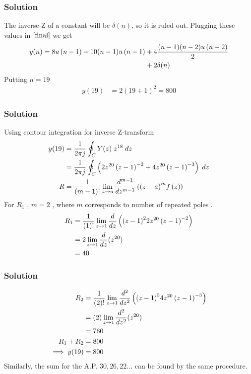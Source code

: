 \documentclass{beamer}
\begin{document}
\begin{frame}
\frametitle{Solution}
The inverse-Z of a constant will be $\delta(n)$, so it is ruled out.
Plugging these values in $\eqref{final}$ we get
\begin{align}
   y(n) = 8u\left(n-1\right) + 10(n-1)u\left(n-1\right) &+ 4\frac{(n-1)(n-2)u\left(n-2\right)}{2} \notag \\
   &+ 2\delta(n)
\end{align}
Putting $n=19$
\begin{align}
      y(19) &= 2(19+1)^2 = 800
\end{align}
    
\end{frame}







\begin{frame}
\frametitle{Solution}
Using contour integration for inverse Z-transform
\begin{align}
    y(19)&=\frac{1}{2\pi j}\oint_{C}Y(z) \;z^{18} \;dz\\  
 &=\frac{1}{2\pi j}\oint_{C}\left(2z^{20}\left(z-1\right)^{-2}+
       4z^{20}\left(z-1\right)^{-3}\right) \;dz\\
       R&=\frac{1}{\left(m-1\right)!}\lim\limits_{z\to a}\frac{d^{m-1}}{dz^{m-1}}\left({(z-a)}^{m}f\left(z\right)\right)\label{eq:6}  
\end{align}
For $R_1$ , $m=2$ , where $m$ corresponds to number of repeated poles .
\begin{align}
    R_1 &=\frac{1}{\left(1\right)!}\lim\limits_{z\to 1}\frac{d}{dz}\left({(z-1)}^{2}2z^{20}\left(z-1\right)^{-2}\right)   \\
    &=2\lim\limits_{z\to 1}\frac{d}{dz}(z^{20})   \\
    &= 40
    \end{align}
    
\end{frame}





\begin{frame}
\frametitle{Solution}
\begin{align}
    R_2 &=\frac{1}{\left(2\right)!}\lim\limits_{z\to 1}\frac{d^{2}}{dz^{2}}\left({(z-1)}^{3}4z^{20}\left(z-1\right)^{-3}\right)   \\
    &=\left(2\right)\lim\limits_{z\to 1}\frac{d^2}{dz^2}(z^{20})   \\
    &= 760\\
    R_1 + R_2 &= 800\\
    \implies  y{(19)} &= 800
\end{align}
Similarly, the sum for the A.P. $30,26,22...$ can be found by the same procedure.
    
\end{frame}
\end{document}
